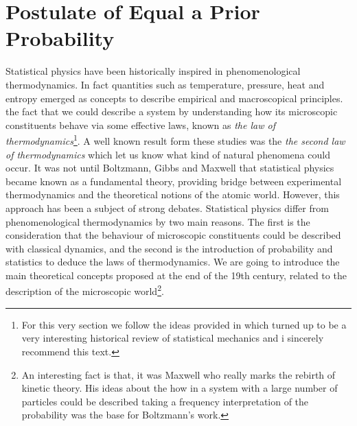 \section{Postulate of Equal a Prior Probability}
Statistical physics have been historically inspired in phenomenological thermodynamics. In fact quantities such as temperature, pressure, heat and entropy emerged as concepts to describe empirical and macroscopical principles. the fact that we could describe a system by understanding how its microscopic constituents behave via some effective laws, known as \textit{the law of thermodynamics\cite{uffink_handbook_2007}}\footnote{For this very section we follow the ideas provided in \cite{uffink_handbook_2007} which turned up to be a very interesting historical review of statistical mechanics and i sincerely recommend this text. }. A well known result form these studies was the \textit{the second law of thermodynamics} which let us know what kind of natural phenomena could occur.
\newline
It was not until Boltzmann, Gibbs and Maxwell that statistical physics became known as a fundamental theory, providing bridge between experimental thermodynamics and the theoretical notions of the atomic world. However, this approach has been a subject of strong debates. Statistical physics differ from phenomenological thermodynamics by two main reasons. The first is the consideration that the behaviour of microscopic constituents could be described with classical dynamics, and the second is the introduction of probability and statistics to deduce the laws of thermodynamics.
\newline
We are going to introduce the main theoretical concepts proposed at the end of the 19th century,  related to the description of the microscopic world\footnote{An interesting fact is that, it was Maxwell who really marks the rebirth of kinetic theory. His ideas about the how in a system with a large number of particles could be described taking a frequency interpretation of the probability was the base for Boltzmann's work.}. 
\newline
